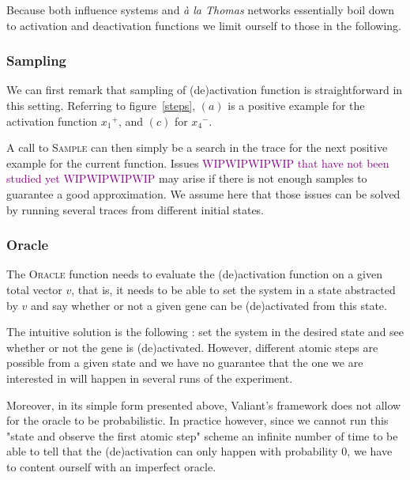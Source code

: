 \documentclass{llncs}
\newcommand{\wip}[1]{\textcolor{Purple}{WIPWIPWIPWIP #1 WIPWIPWIPWIP}}
\begin{document}
Because both influence systems and \textit{\`{a} la Thomas} networks essentially boil down to activation and deactivation functions we limit ourself to those in the following.

\subsubsection{Sampling}

We can first remark that sampling of (de)activation function is straightforward in this setting. Referring to figure~\ref{steps}, $(a)$ is a positive example for the activation function ${x_1}^+$, and $(c)$ for ${x_4}^-$.

A call to \textsc{Sample} can then simply be a search in the trace for the next positive example for the current function. Issues \wip{that have not been studied yet} may arise if there is not enough samples to guarantee a good approximation. 
We assume here that those issues can be solved by running several traces from different initial states.

\subsubsection{Oracle}
The \textsc{Oracle} function needs to evaluate the (de)activation function on a given total vector $v$, that is, it needs to be able to set the system in a state abstracted by $v$ and say whether or not a given gene can be (de)activated from this state.

The intuitive solution is the following : set the system in the desired state and see whether or not the gene is (de)activated. 
However, different atomic steps are possible from a given state and we have no guarantee that the one we are interested in will happen
in several runs of the experiment. 

Moreover, in its simple form presented above, %
Valiant's framework does not allow for the oracle to be probabilistic.
In practice however, since we cannot run this "state and observe the first atomic step" scheme an infinite number of time to be able to tell that the (de)activation can only happen with probability 0,
we have to content ourself with an imperfect oracle.
\end{document}
